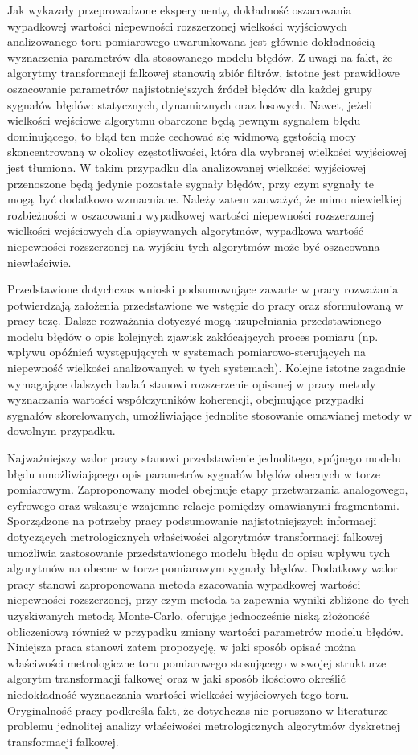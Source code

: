 Jak wykazały przeprowadzone eksperymenty, dokładność oszacowania wypadkowej wartości niepewności rozszerzonej wielkości wyjściowych analizowanego toru pomiarowego uwarunkowana jest głównie dokładnością wyznaczenia parametrów dla stosowanego modelu błędów. Z uwagi na fakt, że algorytmy transformacji falkowej stanowią zbiór filtrów, istotne jest prawidłowe oszacowanie parametrów najistotniejszych źródeł błędów dla każdej grupy sygnałów błędów: statycznych, dynamicznych oraz losowych. Nawet, jeżeli wielkości wejściowe algorytmu obarczone będą pewnym sygnałem błędu dominującego, to błąd ten może cechować się widmową gęstością mocy skoncentrowaną w okolicy częstotliwości, która dla wybranej wielkości wyjściowej jest tłumiona. W takim przypadku dla analizowanej wielkości wyjściowej przenoszone będą jedynie pozostałe sygnały błędów, przy czym sygnały te mogą być dodatkowo wzmacniane. Należy zatem zauważyć, że mimo niewielkiej rozbieżności w oszacowaniu wypadkowej wartości niepewności rozszerzonej wielkości wejściowych dla opisywanych algorytmów, wypadkowa wartość niepewności rozszerzonej na wyjściu tych algorytmów może być oszacowana niewłaściwie.

Przedstawione dotychczas wnioski podsumowujące zawarte w pracy rozważania potwierdzają założenia przedstawione we wstępie do pracy oraz sformułowaną w pracy tezę. Dalsze rozważania dotyczyć mogą uzupełniania przedstawionego modelu błędów o opis kolejnych zjawisk zakłócających proces pomiaru (np. wpływu opóźnień występujących w systemach pomiarowo-sterujących na niepewność wielkości analizowanych w tych systemach). Kolejne istotne zagadnie wymagające dalszych badań stanowi rozszerzenie opisanej w pracy metody wyznaczania wartości współczynników koherencji, obejmujące przypadki sygnałów skorelowanych, umożliwiające jednolite stosowanie omawianej metody w dowolnym przypadku.

Najważniejszy walor pracy stanowi przedstawienie jednolitego, spójnego modelu błędu umożliwiającego opis parametrów sygnałów błędów obecnych w torze pomiarowym. Zaproponowany model obejmuje etapy przetwarzania analogowego, cyfrowego oraz wskazuje wzajemne relacje pomiędzy omawianymi fragmentami. Sporządzone na potrzeby pracy podsumowanie najistotniejszych informacji dotyczących metrologicznych właściwości algorytmów transformacji falkowej umożliwia zastosowanie przedstawionego modelu błędu do opisu wpływu tych algorytmów na obecne w torze pomiarowym sygnały błędów. Dodatkowy walor pracy stanowi zaproponowana metoda szacowania wypadkowej wartości niepewności rozszerzonej, przy czym metoda ta zapewnia wyniki zbliżone do tych uzyskiwanych metodą Monte-Carlo, oferując jednocześnie niską złożoność obliczeniową również w przypadku zmiany wartości parametrów modelu błędów. Niniejsza praca stanowi zatem propozycję, w jaki sposób opisać można właściwości metrologiczne toru pomiarowego stosującego w swojej strukturze algorytm transformacji falkowej oraz w jaki sposób ilościowo określić niedokładność wyznaczania wartości wielkości wyjściowych tego toru. Oryginalność pracy podkreśla fakt, że dotychczas nie poruszano w literaturze problemu jednolitej analizy właściwości metrologicznych algorytmów dyskretnej transformacji falkowej.
